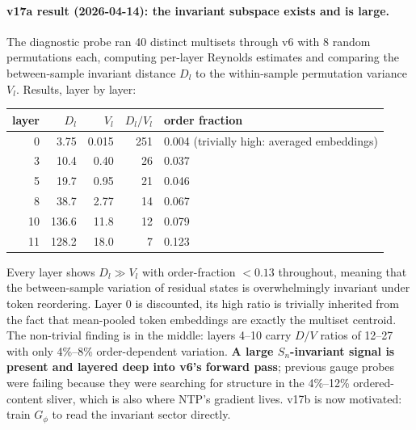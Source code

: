 \documentclass[11pt, a4paper]{article}
\theoremstyle{plain}
\theoremstyle{definition}
\theoremstyle{remark}
\begin{document}
\paragraph{v17a result (2026-04-14): the invariant subspace exists and is large.}
The diagnostic probe ran 40 distinct multisets through v6 with 8 random permutations each, computing per-layer Reynolds estimates and comparing the between-sample invariant distance $D_l$ to the within-sample permutation variance $V_l$.
Results, layer by layer:
\begin{center}
\small
\begin{tabular}{rrrrl}
\toprule
layer & $D_l$ & $V_l$ & $D_l/V_l$ & order fraction \\
\midrule
0  & 3.75   & 0.015  & 251 & 0.004 (trivially high: averaged embeddings) \\
3  & 10.4   & 0.40   & 26  & 0.037 \\
5  & 19.7   & 0.95   & 21  & 0.046 \\
8  & 38.7   & 2.77   & 14  & 0.067 \\
10 & 136.6  & 11.8   & 12  & 0.079 \\
11 & 128.2  & 18.0   & 7   & 0.123 \\
\bottomrule
\end{tabular}
\end{center}
Every layer shows $D_l \gg V_l$ with order-fraction $< 0.13$ throughout, meaning that the between-sample variation of residual states is overwhelmingly invariant under token reordering.
Layer 0 is discounted, its high ratio is trivially inherited from the fact that mean-pooled token embeddings are exactly the multiset centroid.
The non-trivial finding is in the middle: layers 4--10 carry $D/V$ ratios of 12--27 with only 4\%--8\% order-dependent variation.
\textbf{A large $S_n$-invariant signal is present and layered deep into v6's forward pass}; previous gauge probes were failing because they were searching for structure in the 4\%--12\% ordered-content sliver, which is also where NTP's gradient lives.
v17b is now motivated: train $G_\phi$ to read the invariant sector directly.
\end{document}
